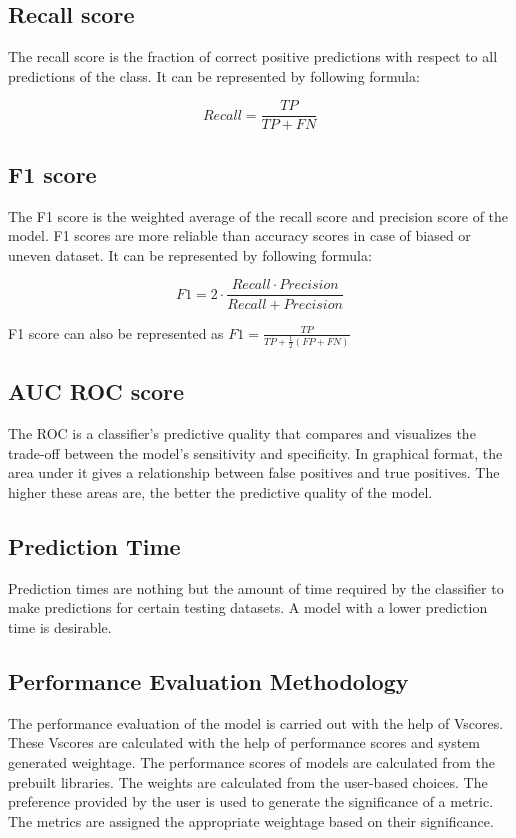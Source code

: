 \subsection{Recall score}\label{subsec:recall_score}
The recall score is the fraction of correct positive predictions with respect to all predictions of the class. It can be represented by following formula:

\begin{equation}\label{eq:recall_score}
  Recall = \frac{TP}{TP+FN}
\end{equation}

\subsection{F1 score}\label{subsec:f1_score}
The F1 score is the weighted average of the recall score and precision score of the model. F1 scores are more reliable than accuracy scores in case of biased or uneven dataset. It can be represented by following formula:

\begin{equation}\label{eq:f1_score}
  F1 = 2 \cdot \frac{Recall \cdot Precision}{Recall + Precision}
\end{equation}

F1 score can also be represented as
$F1 = \frac{TP}{TP+\frac{1}{2}(FP+FN)}$

\subsection{AUC ROC score}\label{subsec:auc_roc_score}
The ROC is a classifier's predictive quality that compares and visualizes the trade-off between the model's sensitivity and specificity. In graphical format, the area under it gives a relationship between false positives and true positives. The higher these areas are, the better the predictive quality of the model.

\subsection{Prediction Time}\label{subsec:prediction_time}
Prediction times are nothing but the amount of time required by the classifier to make predictions for certain testing datasets. A model with a lower prediction time is desirable.

\subsection{Performance Evaluation Methodology} \label{subsec:performance_evaluation_methodology}
The performance evaluation of the model is carried out with the help of Vscores. These Vscores are calculated with the help of performance scores and system generated weightage. The performance scores of models are calculated from the prebuilt libraries. The weights are calculated from the user-based choices. The preference provided by the user is used to generate the significance of a metric. The metrics are assigned the appropriate weightage based on their significance.

